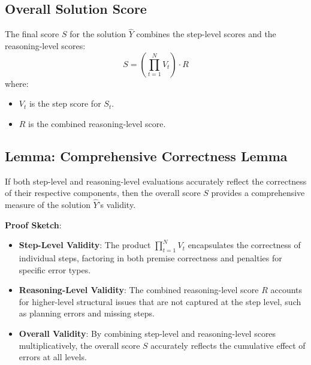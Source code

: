 \subsection*{Overall Solution Score}

The final score \( S \) for the solution \( \hat{Y} \) combines the step-level scores and the reasoning-level scores:
\[
S = \left( \prod_{t=1}^N V_t \right) \cdot R
\]
where:
\begin{itemize}
    \item \( V_t \) is the step score for \( S_t \).
    \item \( R \) is the combined reasoning-level score.
\end{itemize}

\subsection*{Lemma: Comprehensive Correctness Lemma}

If both step-level and reasoning-level evaluations accurately reflect the correctness of their respective components, then the overall score \( S \) provides a comprehensive measure of the solution \( \hat{Y} \)'s validity.

\textbf{Proof Sketch}:
\begin{itemize}
    \item \textbf{Step-Level Validity}: The product \( \prod_{t=1}^N V_t \) encapsulates the correctness of individual steps, factoring in both premise correctness and penalties for specific error types.
    \item \textbf{Reasoning-Level Validity}: The combined reasoning-level score \( R \) accounts for higher-level structural issues that are not captured at the step level, such as planning errors and missing steps.
    \item \textbf{Overall Validity}: By combining step-level and reasoning-level scores multiplicatively, the overall score \( S \) accurately reflects the cumulative effect of errors at all levels.
\end{itemize}
